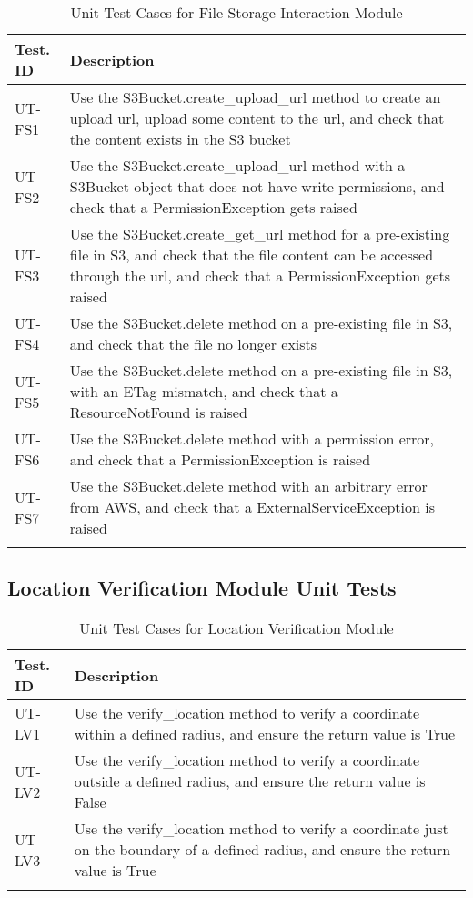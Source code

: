 \documentclass[12pt, titlepage]{article}
\begin{document}
\begin{longtable}{|m{2cm}|m{10cm}|}
  \hline
  \textbf{Test. ID} & \textbf{Description}\\ \hline
  UT-FS1 & Use the S3Bucket.create\_upload\_url method to create an
  upload url, upload some content to the url, and check that the
  content exists in the S3 bucket\\ \hline
  UT-FS2 & Use the S3Bucket.create\_upload\_url method with a
  S3Bucket object that does not have write permissions, and check
  that a PermissionException gets raised\\ \hline
  UT-FS3 & Use the S3Bucket.create\_get\_url method for a
  pre-existing file in S3, and check that the file content can be
  accessed through the url, and check that a PermissionException gets
  raised\\ \hline
  UT-FS4 & Use the S3Bucket.delete method on a pre-existing file in
  S3, and check that the file no longer exists\\ \hline
  UT-FS5 & Use the S3Bucket.delete method on a pre-existing file in
  S3, with an ETag mismatch, and check that a ResourceNotFound is
  raised\\ \hline
  UT-FS6 & Use the S3Bucket.delete method with a permission error,
  and check that a PermissionException is raised\\ \hline
  UT-FS7 & Use the S3Bucket.delete method with an arbitrary error
  from AWS, and check that a ExternalServiceException is raised\\ \hline
  \caption{Unit Test Cases for File Storage Interaction Module}
\end{longtable}

\subsection{Location Verification Module Unit Tests}

\begin{longtable}{|m{2cm}|m{10cm}|}
  \hline
  \textbf{Test. ID} & \textbf{Description} \\ \hline
  UT-LV1 & Use the verify\_location method to verify a coordinate
  within a defined radius, and ensure the return value is True\\ \hline
  UT-LV2 & Use the verify\_location method to verify a coordinate
  outside a defined radius, and ensure the return value is False\\ \hline
  UT-LV3 & Use the verify\_location method to verify a coordinate
  just on the boundary of a defined radius, and ensure the return
  value is True\\ \hline
  \caption{Unit Test Cases for Location Verification Module}
\end{longtable}
\end{document}
